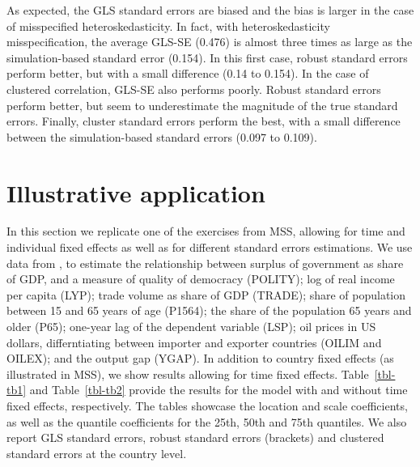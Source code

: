 \documentclass[
  authoryear,
  review,
  1p]{elsarticle}
\begin{document}
As expected, the GLS standard errors are biased and the bias is larger
in the case of misspecified heteroskedasticity. In fact, with
heteroskedasticity misspecification, the average GLS-SE (0.476) is
almost three times as large as the simulation-based standard error
(0.154). In this first case, robust standard errors perform better, but
with a small difference (0.14 to 0.154). In the case of clustered
correlation, GLS-SE also performs poorly. Robust standard errors perform
better, but seem to underestimate the magnitude of the true standard
errors. Finally, cluster standard errors perform the best, with a small
difference between the simulation-based standard errors (0.097 to
0.109).

\hypertarget{illustrative-application}{%
\section{Illustrative application}\label{illustrative-application}}

In this section we replicate one of the exercises from MSS, allowing for
time and individual fixed effects as well as for different standard
errors estimations. We use data from \citet{persson_economic_2005}, to
estimate the relationship between surplus of government as share of GDP,
and a measure of quality of democracy (POLITY); log of real income per
capita (LYP); trade volume as share of GDP (TRADE); share of population
between 15 and 65 years of age (P1564); the share of the population 65
years and older (P65); one-year lag of the dependent variable (LSP); oil
prices in US dollars, differntiating between importer and exporter
countries (OILIM and OILEX); and the output gap (YGAP). In addition to
country fixed effects (as illustrated in MSS), we show results allowing
for time fixed effects. Table~\ref{tbl-tb1} and Table~\ref{tbl-tb2}
provide the results for the model with and without time fixed effects,
respectively. The tables showcase the location and scale coefficients,
as well as the quantile coefficients for the 25th, 50th and 75th
quantiles. We also report GLS standard errors, robust standard errors
(brackets) and clustered standard errors at the country level.
\end{document}
